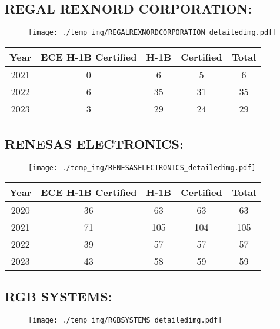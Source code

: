 \documentclass{article}%
\begin{document}
%
\newpage%
\subsection{REGAL REXNORD CORPORATION:}%
\label{subsec:REGALREXNORDCORPORATION}%
\label{REGALREXNORDCORPORATIONdetailed}%


\begin{figure}[htbp]%
\centering%
\texttt{[image: ./temp\_img/REGALREXNORDCORPORATION\_detailedimg.pdf]}%
\end{figure}

%
\begin{longtable}{c|c|c|c|c}%
\hline%
Year&ECE H{-}1B Certified&H{-}1B&Certified&Total\\%
\hline%
2021&0&6&5&6\\%
\hline%
2022&6&35&31&35\\%
\hline%
2023&3&29&24&29\\%
\hline%
\end{longtable}

%
\newpage%
\subsection{RENESAS ELECTRONICS:}%
\label{subsec:RENESASELECTRONICS}%
\label{RENESASELECTRONICSdetailed}%


\begin{figure}[htbp]%
\centering%
\texttt{[image: ./temp\_img/RENESASELECTRONICS\_detailedimg.pdf]}%
\end{figure}

%
\begin{longtable}{c|c|c|c|c}%
\hline%
Year&ECE H{-}1B Certified&H{-}1B&Certified&Total\\%
\hline%
2020&36&63&63&63\\%
\hline%
2021&71&105&104&105\\%
\hline%
2022&39&57&57&57\\%
\hline%
2023&43&58&59&59\\%
\hline%
\end{longtable}

%
\newpage%
\subsection{RGB SYSTEMS:}%
\label{subsec:RGBSYSTEMS}%
\label{RGBSYSTEMSdetailed}%


\begin{figure}[htbp]%
\centering%
\texttt{[image: ./temp\_img/RGBSYSTEMS\_detailedimg.pdf]}%
\end{figure}
\end{document}
